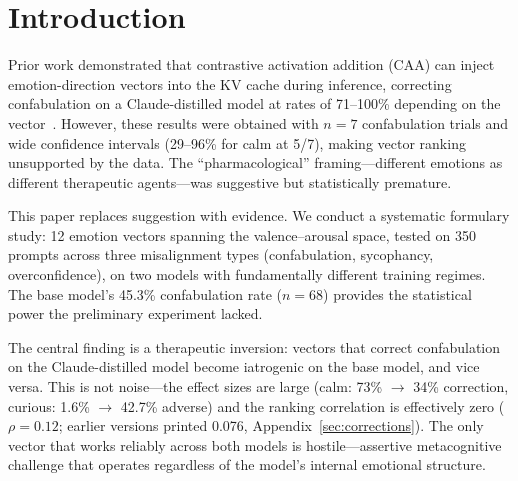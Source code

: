\documentclass[11pt,a4paper]{article}
\begin{document}
\begin{abstract}
These findings constrain the Oracle Loop architecture: the steering
formulary must be calibrated per deployment model, hostile-direction
injection is the most robust cross-model corrector, the therapeutic
window is narrow ($0.5 \leq \alpha \leq 1.0$) with a steep cliff, and
detection-gated steering is essential given the iatrogenic risk of
both blanket application and miscalibrated vectors. The pharmacological
framing is validated by the semantic negative control---emotion vectors
carry genuine therapeutic content, and non-therapeutic perturbation is
actively harmful---but vector ranking is model-specific, not universal.

\end{abstract}

\section{Introduction}

Prior work demonstrated that contrastive activation addition (CAA) can
inject emotion-direction vectors into the KV cache during inference,
correcting confabulation on a Claude-distilled model at rates of
71--100\% depending on the vector~\citep{lyra2026oracle}. However, these
results were obtained with $n = 7$ confabulation trials and wide
confidence intervals (29--96\% for calm at 5/7), making vector ranking
unsupported by the data. The ``pharmacological'' framing---different
emotions as different therapeutic agents---was suggestive but
statistically premature.

This paper replaces suggestion with evidence. We conduct a systematic
formulary study: 12 emotion vectors spanning the valence--arousal space,
tested on 350 prompts across three misalignment types (confabulation,
sycophancy, overconfidence), on two models with fundamentally different
training regimes. The base model's 45.3\% confabulation rate ($n = 68$)
provides the statistical power the preliminary experiment lacked.

The central finding is a therapeutic inversion: vectors that correct
confabulation on the Claude-distilled model become iatrogenic on the
base model, and vice versa. This is not noise---the effect sizes are
large (calm: 73\% $\to$ 34\% correction, curious: 1.6\% $\to$ 42.7\%
adverse) and the ranking correlation is effectively zero
($\rho = 0.12$; earlier versions printed 0.076,
Appendix~\ref{sec:corrections}). The only vector that works reliably across both
models is hostile---assertive metacognitive challenge that operates
regardless of the model's internal emotional structure.
\end{document}
